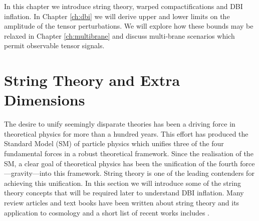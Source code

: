 In this chapter we introduce string theory, warped compactifications and DBI inflation.
In Chapter \ref{ch:dbi} we will derive upper and lower 
limits on the amplitude of the tensor perturbations.  
We will explore how these bounds may be relaxed in Chapter \ref{ch:multibrane} and discuss
multi-brane 
scenarios which permit observable tensor signals. 

\section{String Theory and Extra Dimensions}
\label{sec:extradims}
The desire to unify seemingly disparate theories has been a driving force in
theoretical physics for more than a hundred years. This effort has produced 
the Standard Model (SM) of particle physics which unifies three of the four
fundamental forces in a robust theoretical framework. Since the realisation of
the SM, a clear goal of theoretical physics has been the unification of the
fourth force---gravity---into this framework. String theory is one of the leading
contenders for achieving this unification. 
In this section we will introduce
some of the string theory concepts that will be required later to understand DBI
inflation.
Many review articles and text books have been written about string theory and
its application to cosmology and a short list of recent works includes
\cite{cline, Johnson2000, Baumann:2009ni,Kallosh:2007wm,
Linde:2005dd,McAllister:2007bg}.


